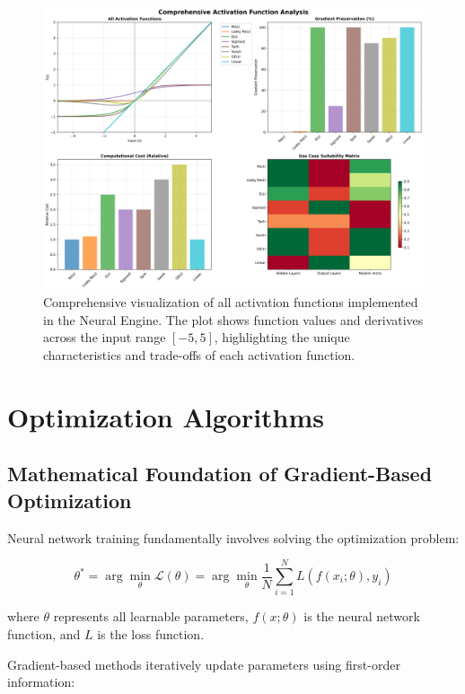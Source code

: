 \documentclass[11pt,a4paper]{report}
\begin{document}
\begin{figure}[H]
\centering
\includegraphics[width=\textwidth]{activation_functions_comprehensive.png}
\caption{Comprehensive visualization of all activation functions implemented in the Neural Engine. The plot shows function values and derivatives across the input range $[-5, 5]$, highlighting the unique characteristics and trade-offs of each activation function.}
\label{fig:activation_comprehensive}
\end{figure}

\section{Optimization Algorithms}

\subsection{Mathematical Foundation of Gradient-Based Optimization}

Neural network training fundamentally involves solving the optimization problem:

\begin{equation}
\theta^* = \arg\min_\theta \mathcal{L}(\theta) = \arg\min_\theta \frac{1}{N}\sum_{i=1}^N L(f(x_i; \theta), y_i)
\end{equation}

where $\theta$ represents all learnable parameters, $f(x; \theta)$ is the neural network function, and $L$ is the loss function.

Gradient-based methods iteratively update parameters using first-order information:
\end{document}

